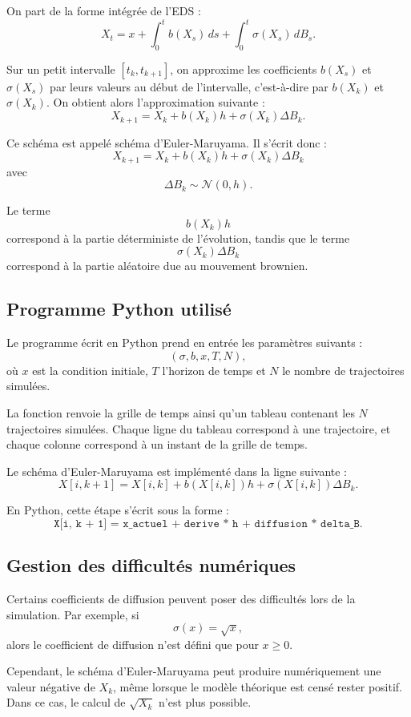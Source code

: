 \documentclass[12pt,a4paper]{article}
\theoremstyle{remark}
\begin{document}
On part de la forme intégrée de l’EDS :
\[
X_t = x + \int_0^t b(X_s)\,ds + \int_0^t \sigma(X_s)\,dB_s.
\]

Sur un petit intervalle $[t_k,t_{k+1}]$, on approxime les coefficients $b(X_s)$ et $\sigma(X_s)$ par leurs valeurs au début de l’intervalle, c’est-à-dire par $b(X_k)$ et $\sigma(X_k)$. On obtient alors l’approximation suivante :
\[
X_{k+1}
=
X_k
+
b(X_k)h
+
\sigma(X_k)\Delta B_k.
\]

Ce schéma est appelé schéma d’Euler-Maruyama. Il s’écrit donc :
\[
\boxed{
X_{k+1}
=
X_k
+
b(X_k)h
+
\sigma(X_k)\Delta B_k
}
\]
avec
\[
\Delta B_k \sim \mathcal{N}(0,h).
\]

Le terme
\[
b(X_k)h
\]
correspond à la partie déterministe de l’évolution, tandis que le terme
\[
\sigma(X_k)\Delta B_k
\]
correspond à la partie aléatoire due au mouvement brownien.

\subsection{Programme Python utilisé}

Le programme écrit en Python prend en entrée les paramètres suivants :
\[
(\sigma,b,x,T,N),
\]
où $x$ est la condition initiale, $T$ l’horizon de temps et $N$ le nombre de trajectoires simulées.

La fonction renvoie la grille de temps ainsi qu’un tableau contenant les $N$ trajectoires simulées. Chaque ligne du tableau correspond à une trajectoire, et chaque colonne correspond à un instant de la grille de temps.

Le schéma d’Euler-Maruyama est implémenté dans la ligne suivante :
\[
X[i,k+1]
=
X[i,k]
+
b(X[i,k])h
+
\sigma(X[i,k])\Delta B_k.
\]

En Python, cette étape s’écrit sous la forme :
\[
\texttt{X[i, k + 1] = x\_actuel + derive * h + diffusion * delta\_B}.
\]

\subsection{Gestion des difficultés numériques}

Certains coefficients de diffusion peuvent poser des difficultés lors de la simulation. Par exemple, si
\[
\sigma(x)=\sqrt{x},
\]
alors le coefficient de diffusion n’est défini que pour $x\geq 0$.

Cependant, le schéma d’Euler-Maruyama peut produire numériquement une valeur négative de $X_k$, même lorsque le modèle théorique est censé rester positif. Dans ce cas, le calcul de $\sqrt{X_k}$ n’est plus possible.
\end{document}
